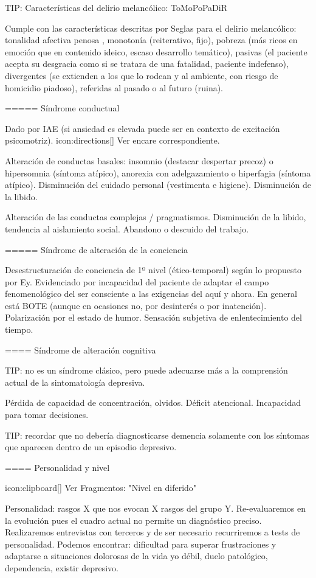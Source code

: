 \documentclass{scrbook}
\begin{document}
TIP: Características del delirio melancólico: ToMoPoPaDiR

Cumple con las características descritas por Seglas para el delirio melancólico: tonalidad afectiva penosa , monotonía (reiterativo, fijo), pobreza (más ricos en emoción que en contenido ideico, escaso desarrollo temático), pasivas (el paciente acepta su desgracia como si se tratara de una fatalidad, paciente indefenso), divergentes (se extienden a los que lo rodean y al ambiente, con riesgo de homicidio piadoso), referidas al pasado o al futuro (ruina).

===== Síndrome conductual

Dado por IAE (si ansiedad es elevada puede ser en contexto de excitación psicomotriz). icon:directions[] Ver encare correspondiente.

Alteración de conductas basales: insomnio (destacar despertar precoz) o hipersomnia (síntoma atípico), anorexia con adelgazamiento o hiperfagia (síntoma atípico). Disminución del cuidado personal (vestimenta e higiene). Disminución de la libido.

Alteración de las conductas complejas / pragmatismos. Disminución de la libido, tendencia al aislamiento social. Abandono o descuido del trabajo.

===== Síndrome de alteración de la conciencia

Desestructuración de conciencia de 1º nivel (ético-temporal) según lo propuesto por Ey. Evidenciado por incapacidad del paciente de adaptar el campo fenomenológico del ser consciente a las exigencias del aquí y ahora.
En general está BOTE (aunque en ocasiones no, por desinterés o por inatención). Polarización por el estado de humor.
Sensación subjetiva de enlentecimiento del tiempo.

==== Síndrome de alteración cognitiva

TIP: no es un síndrome clásico, pero puede adecuarse más a la comprensión actual de la sintomatología depresiva.

Pérdida de capacidad de concentración, olvidos. Déficit atencional.
Incapacidad para tomar decisiones.

TIP: recordar que no debería diagnosticarse demencia solamente con los síntomas que aparecen dentro de un episodio depresivo.

==== Personalidad y nivel

icon:clipboard[] Ver Fragmentos: "Nivel en diferido"

Personalidad: rasgos X que nos evocan X rasgos del grupo Y. Re-evaluaremos en la evolución pues el cuadro actual no permite un diagnóstico preciso. Realizaremos entrevistas con terceros y de ser necesario recurriremos a tests de personalidad. Podemos encontrar: dificultad para superar frustraciones y adaptarse a situaciones dolorosas de la vida yo débil, duelo patológico, dependencia, existir depresivo.
\end{document}
